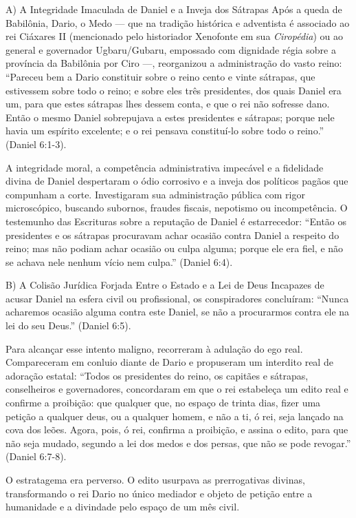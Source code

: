 \documentclass[11pt,a4paper,openany]{book}
\begin{document}
A) A Integridade Imaculada de Daniel e a Inveja dos Sátrapas
Após a queda de Babilônia, Dario, o Medo — que na tradição histórica e adventista é associado ao rei Ciáxares II (mencionado pelo historiador Xenofonte em sua \textit{Ciropédia}) ou ao general e governador Ugbaru/Gubaru, empossado com dignidade régia sobre a província da Babilônia por Ciro —, reorganizou a administração do vasto reino:
``Pareceu bem a Dario constituir sobre o reino cento e vinte sátrapas, que estivessem sobre todo o reino; e sobre eles três presidentes, dos quais Daniel era um, para que estes sátrapas lhes dessem conta, e que o rei não sofresse dano. Então o mesmo Daniel sobrepujava a estes presidentes e sátrapas; porque nele havia um espírito excelente; e o rei pensava constituí-lo sobre todo o reino.'' (Daniel 6:1-3).

A integridade moral, a competência administrativa impecável e a fidelidade divina de Daniel despertaram o ódio corrosivo e a inveja dos políticos pagãos que compunham a corte. Investigaram sua administração pública com rigor microscópico, buscando subornos, fraudes fiscais, nepotismo ou incompetência. O testemunho das Escrituras sobre a reputação de Daniel é estarrecedor:
``Então os presidentes e os sátrapas procuravam achar ocasião contra Daniel a respeito do reino; mas não podiam achar ocasião ou culpa alguma; porque ele era fiel, e não se achava nele nenhum vício nem culpa.'' (Daniel 6:4).

B) A Colisão Jurídica Forjada Entre o Estado e a Lei de Deus
Incapazes de acusar Daniel na esfera civil ou profissional, os conspiradores concluíram:
``Nunca acharemos ocasião alguma contra este Daniel, se não a procurarmos contra ele na lei do seu Deus.'' (Daniel 6:5).

Para alcançar esse intento maligno, recorreram à adulação do ego real. Compareceram em conluio diante de Dario e propuseram um interdito real de adoração estatal:
``Todos os presidentes do reino, os capitães e sátrapas, conselheiros e governadores, concordaram em que o rei estabeleça um edito real e confirme a proibição: que qualquer que, no espaço de trinta dias, fizer uma petição a qualquer deus, ou a qualquer homem, e não a ti, ó rei, seja lançado na cova dos leões. Agora, pois, ó rei, confirma a proibição, e assina o edito, para que não seja mudado, segundo a lei dos medos e dos persas, que não se pode revogar.'' (Daniel 6:7-8).

O estratagema era perverso. O edito usurpava as prerrogativas divinas, transformando o rei Dario no único mediador e objeto de petição entre a humanidade e a divindade pelo espaço de um mês civil.
\end{document}
